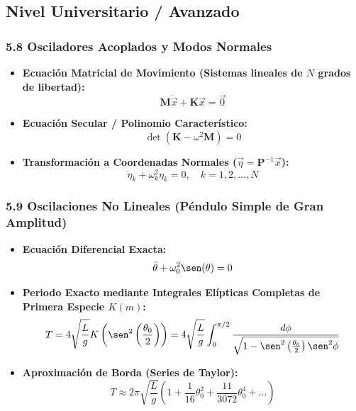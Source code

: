 \documentclass[11pt,a4paper]{article}
\begin{document}
\subsection*{Nivel Universitario / Avanzado}

\subsubsection*{5.8 Osciladores Acoplados y Modos Normales}

\begin{itemize}
  \item \textbf{Ecuación Matricial de Movimiento (Sistemas lineales de $N$ grados de libertad):}
  \[
    \mathbf{M} \ddot{\vec{x}} + \mathbf{K} \vec{x} = \vec{0}
  \]
  \item \textbf{Ecuación Secular / Polinomio Característico:}
  \[
    \det(\mathbf{K} - \omega^2 \mathbf{M}) = 0
  \]
  \item \textbf{Transformación a Coordenadas Normales ($\vec{\eta} = \mathbf{P}^{-1} \vec{x}$):}
  \[
    \ddot{\eta}_k + \omega_k^2 \eta_k = 0, \quad k = 1, 2, \dots, N
  \]
\end{itemize}

\subsubsection*{5.9 Oscilaciones No Lineales (Péndulo Simple de Gran Amplitud)}

\begin{itemize}
  \item \textbf{Ecuación Diferencial Exacta:}
  \[
    \ddot{\theta} + \omega_0^2 \sen(\theta) = 0
  \]
  \item \textbf{Periodo Exacto mediante Integrales Elípticas Completas de Primera Especie $K(m)$:}
  \[
    T = 4\sqrt{\frac{L}{g}} K\left(\sen^2\left(\frac{\theta_0}{2}\right)\right) = 4\sqrt{\frac{L}{g}} \int_0^{\pi/2} \frac{d\phi}{\sqrt{1 - \sen^2\left(\frac{\theta_0}{2}\right) \sen^2\phi}}
  \]
  \item \textbf{Aproximación de Borda (Series de Taylor):}
  \[
    T \approx 2\pi\sqrt{\frac{L}{g}} \left( 1 + \frac{1}{16}\theta_0^2 + \frac{11}{3072}\theta_0^4 + \dots \right)
  \]
\end{itemize}
\end{document}
